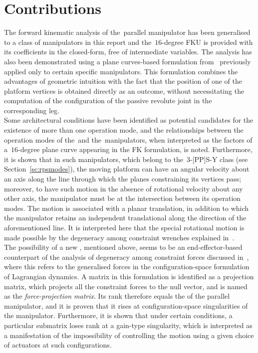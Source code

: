 \documentclass[DD]{iitmdiss}
\newcommand{\mref}[1]{\ref{#1}}
\newcommand{\mcite}[1]{\cite{#1}}
\begin{document}
\section{Contributions}
The forward kinematic analysis of the~\rps parallel manipulator has been generalised to a class of manipulators in this report and the~$16$-degree FKU is provided with its coefficients in the closed-form, free of intermediate variables. The analysis has also been demonstrated using a plane curves-based formulation from~\mcite{tk2017a} previously applied only to certain specific manipulators. This formulation combines the advantages of geometric intuition with the fact that the position of one of the platform vertices is obtained directly as an outcome, without necessitating the computation of the configuration of the passive revolute joint in the corresponding leg. \\
Some architectural conditions have been identified as potential candidates for the existence of more than one operation mode, and the relationships between the operation modes of the~\rps and the~\rrs manipulators, when interpreted as the factors of a~$16$-degree plane curve appearing in the FK formulation, is noted. Furthermore, it is shown that in such manipulators, which belong to the~3-[PP]S-Y class (see Section~\mref{sc:rpsmodes}), the moving platform can have an angular velocity about an axis along the line through which the planes constraining its vertices pass; moreover, to have such motion in the absence of rotational velocity about any other axis, the manipulator must be at the intersection between its operation modes. The motion is associated with a planar translation, in addition to which the manipulator retains an independent translational \dof along the direction of the aforementioned line. It is interpreted here that the special rotational motion is made possible by the degeneracy among constraint wrenches explained in~\mcite{zlatanov2002b}. \\
The possibility of a new \dof, mentioned above, seems to be an end-effector-based counterpart of the analysis of degeneracy among constraint forces discussed in~\mcite{muralidharan2018}, where this refers to the generalised forces in the configuration-space formulation of Lagrangian dynamics. A matrix in this formulation is identified as a projection matrix, which projects all the constraint forces to the null vector, and is named as the \emph{force-projection matrix}. Its rank therefore equals the \dof of the parallel manipulator, and it is proven that it rises at configuration-space singularities of the manipulator. Furthermore, it is shown that under certain conditions, a particular submatrix loses rank at a gain-type singularity, which is interpreted as a manifestation of the impossibility of controlling the motion using a given choice of actuators at such configurations. 
\end{document}
